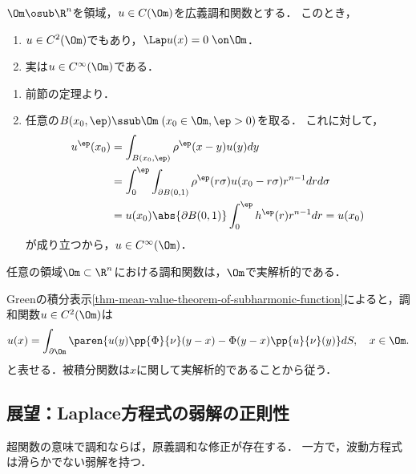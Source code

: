 \documentclass[uplatex,dvipdfmx]{jsreport}
\begin{document}
\begin{theorem}[Laplace方程式の解の正則性]
    $\Om\osub\R^n$を領域，$u\in C(\Om)$を広義調和関数とする．
    このとき，
    \begin{enumerate}
        \item $u\in C^2(\Om)$でもあり，$\Lap u(x)=0\;\on\Om$．
        \item 実は$u\in C^\infty(\Om)$である．
    \end{enumerate}
\end{theorem}
\begin{Proof}\mbox{}
    \begin{enumerate}
        \item 前節の定理より．
        \item 任意の$B(x_0,\ep)\ssub\Om\;(x_0\in\Om,\ep>0)$を取る．
        これに対して，
        \begin{align*}
            u^\ep(x_0)&=\int_{B(x_0,\ep)}\rho^\ep(x-y)u(y)dy\\
            &=\int^\ep_0\int_{\partial B(0,1)}\rho^\ep(r\sigma)u(x_0-r\sigma)r^{n-1}drd\sigma\\
            &=u(x_0)\abs{\partial B(0,1)}\int^\ep_0h^\ep(r)r^{n-1}dr=u(x_0)
        \end{align*}
        が成り立つから，$u\in C^\infty(\Om)$．
    \end{enumerate}
\end{Proof}

\begin{theorem}[調和関数は解析的である]
    任意の領域$\Om\subset\R^n$における調和関数は，$\Om$で実解析的である．
\end{theorem}
\begin{Proof}
    Greenの積分表示\ref{thm-mean-value-theorem-of-subharmonic-function}によると，調和関数$u\in C^2(\Om)$は
    \[u(x)=\int_{\partial\Om}\paren{u(y)\pp{\Phi}{\nu}(y-x)-\Phi(y-x)\pp{u}{\nu}(y)}dS,\quad x\in\Om.\]
    と表せる．被積分関数は$x$に関して実解析的であることから従う．
\end{Proof}

\subsection{展望：Laplace方程式の弱解の正則性}

\begin{tcolorbox}[colframe=ForestGreen, colback=ForestGreen!10!white,breakable,colbacktitle=ForestGreen!40!white,coltitle=black,fonttitle=\bfseries\sffamily,
title=]
    超関数の意味で調和ならば，原義調和な修正が存在する．
    一方で，波動方程式は滑らかでない弱解を持つ．
\end{tcolorbox}
\end{document}
